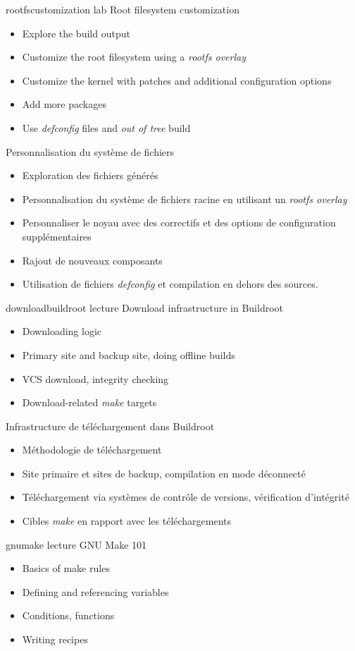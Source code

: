 {rootfscustomization}
{lab}
{Root filesystem customization}
{
  \begin{itemize}
  \item Explore the build output
  \item Customize the root filesystem using a {\em rootfs overlay}
  \item Customize the kernel with patches and additional configuration
    options
  \item Add more packages
  \item Use {\em defconfig} files and {\em out of tree} build
  \end{itemize}
}
{Personnalisation du système de fichiers}
{
  \begin{itemize}
  \item Exploration des fichiers générés
  \item Personnalisation du système de fichiers racine en utilisant un {\em rootfs overlay}
  \item Personnaliser le noyau avec des correctifs et des options de
	configuration supplémentaires
  \item Rajout de nouveaux composants
  \item Utilisation de fichiers {\em defconfig} et compilation en
	dehors des sources.
  \end{itemize}
}
{downloadbuildroot}
{lecture}
{Download infrastructure in Buildroot}
{
  \begin{itemize}
  \item Downloading logic
  \item Primary site and backup site, doing offline builds
  \item VCS download, integrity checking
  \item Download-related {\em make} targets
  \end{itemize}
}
{Infrastructure de téléchargement dans Buildroot}
{
  \begin{itemize}
  \item Méthodologie de téléchargement
  \item Site primaire et sites de backup, compilation en mode déconnecté
  \item Téléchargement via systèmes de contrôle de versions,
	vérification d'intégrité
  \item Cibles {\em make} en rapport avec les téléchargements
  \end{itemize}
}
{gnumake}
{lecture}
{GNU Make 101}
{
  \begin{itemize}
  \item Basics of make rules
  \item Defining and referencing variables
  \item Conditions, functions
  \item Writing recipes
  \end{itemize}
}
